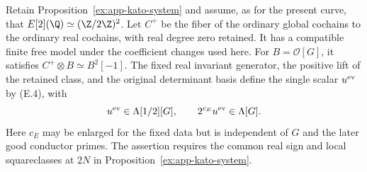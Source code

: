 \begin{proposition}\label{ex:app-even-scalar}
Retain Proposition~\ref{ex:app-kato-system} and assume, as for the
present curve, that $E[2](\Q)\simeq(\Z/2\Z)^2$. Let $C^+$ be the
fiber of the ordinary global cochains to the ordinary real cochains,
with real degree zero retained. It has a compatible finite free model
under the coefficient changes used here. For
$B=\mathscr O[G]$, it satisfies $C^+\otimes B\simeq B^2[-1]$.
The fixed real invariant generator, the positive lift of the retained
class, and the original determinant basis define the single scalar
$u^{\rm ev}$ by (E.4), with
\[
 u^{\rm ev}\in\Lambda[1/2][G],\qquad
 2^{c_E}u^{\rm ev}\in\Lambda[G].
\]
Here $c_E$ may be enlarged for the fixed data but is independent of
$G$ and the later good conductor primes. The assertion requires the
common real sign and local squareclasses at $2N$ in
Proposition~\ref{ex:app-kato-system}.
\end{proposition}
